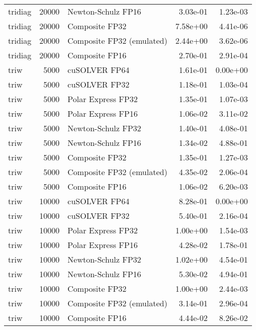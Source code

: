 \begin{table}
\begin{tabular}{lrlrr}
  tridiag & 20000 &        Newton-Schulz FP16 &  3.03e-01 &        1.23e-03 \\
  tridiag & 20000 &            Composite FP32 &  7.58e+00 &        4.41e-06 \\
  tridiag & 20000 & Composite FP32 (emulated) &  2.44e+00 &        3.62e-06 \\
  tridiag & 20000 &            Composite FP16 &  2.70e-01 &        2.91e-04 \\
     triw &  5000 &             cuSOLVER FP64 &  1.61e-01 &        0.00e+00 \\
     triw &  5000 &             cuSOLVER FP32 &  1.18e-01 &        1.03e-04 \\
     triw &  5000 &        Polar Express FP32 &  1.35e-01 &        1.07e-03 \\
     triw &  5000 &        Polar Express FP16 &  1.06e-02 &        3.11e-02 \\
     triw &  5000 &        Newton-Schulz FP32 &  1.40e-01 &        4.08e-01 \\
     triw &  5000 &        Newton-Schulz FP16 &  1.34e-02 &        4.88e-01 \\
     triw &  5000 &            Composite FP32 &  1.35e-01 &        1.27e-03 \\
     triw &  5000 & Composite FP32 (emulated) &  4.35e-02 &        2.06e-04 \\
     triw &  5000 &            Composite FP16 &  1.06e-02 &        6.20e-03 \\
     triw & 10000 &             cuSOLVER FP64 &  8.28e-01 &        0.00e+00 \\
     triw & 10000 &             cuSOLVER FP32 &  5.40e-01 &        2.16e-04 \\
     triw & 10000 &        Polar Express FP32 &  1.00e+00 &        1.54e-03 \\
     triw & 10000 &        Polar Express FP16 &  4.28e-02 &        1.78e-01 \\
     triw & 10000 &        Newton-Schulz FP32 &  1.02e+00 &        4.54e-01 \\
     triw & 10000 &        Newton-Schulz FP16 &  5.30e-02 &        4.94e-01 \\
     triw & 10000 &            Composite FP32 &  1.00e+00 &        2.44e-03 \\
     triw & 10000 & Composite FP32 (emulated) &  3.14e-01 &        2.96e-04 \\
     triw & 10000 &            Composite FP16 &  4.44e-02 &        8.26e-02 \\

\end{tabular}
\end{table}
